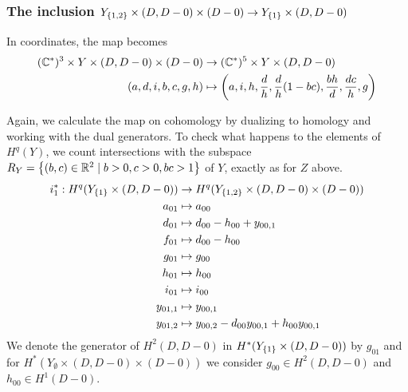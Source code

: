 \subsubsection{The inclusion $Y_{\left\{ 1,2 \right\}}\times (D,D-0) 
\times (D-0) \to Y_{\left\{ 1 \right\}} \times (D,D-0)$}   

In coordinates, the map becomes
\begin{align*}
  (\mathbb{C}^*)^3 \times Y \times (D,D-0)\times (D-0) &\to (\mathbb{C}^*)^5 \times Y
  \times (D,D-0) \\
  (a,d,i,b,c,g,h) &\mapsto \left(a,i,h,\frac{d}{h},
  \frac{d}{h}(1-bc), \frac{bh}{d},\frac{dc}{h},g\right)
\end{align*}

Again, we calculate the map on cohomology by dualizing to homology
and working with the dual generators. To check what happens to the
elements of $H^q(Y)$, we count intersections with the subspace $R_Y =
\left\{ (b,c)\in \mathbb{R}^2 \mid b > 0, c > 0, bc > 1 \right\}$ of $Y$, exactly as for
$Z$ above.
\begin{align*}
  i_1^* : H^q(Y_{\left\{ 1 \right\}}\times (D,D-0)) &\to H^q(Y_{\left\{ 1,2 \right\}}\times
  (D,D-0)\times (D-0)) \\
  a_{01} &\mapsto a_{00} \\
  d_{01} &\mapsto d_{00}-h_{00} + y_{00,1} \\
  f_{01} &\mapsto d_{00} - h_{00} \\
  g_{01} &\mapsto g_{00} \\
  h_{01} &\mapsto h_{00} \\
  i_{01} &\mapsto i_{00} \\
  y_{01,1} &\mapsto y_{00,1} \\
  y_{01,2} &\mapsto y_{00,2} - d_{00}y_{00,1} + h_{00}y_{00,1}
\end{align*}
We denote the generator of $H^2(D,D-0)$ in
$H^*(Y_{\left\{ 1 \right\}}\times (D,D-0))$ by $g_{01}$ and for
$H^*(Y_{\emptyset} \times (D,D-0) \times (D-0))$ we consider $g_{00}\in
H^2(D,D-0)$ and $h_{00} \in H^1(D-0)$. 

